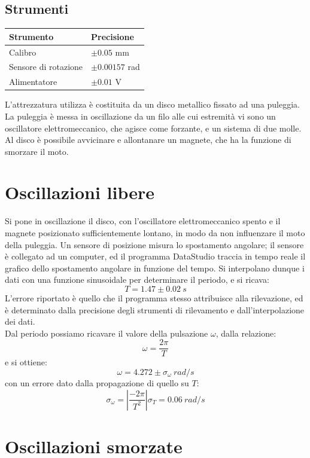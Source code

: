 \subsection{Strumenti}
\begin{center}
\begin{tabular}{l|l}
Strumento & Precisione\\
\midrule
Calibro & $\pm 0.05$ mm\\ 
Sensore di rotazione & $\pm 0.00157$ rad\\ 
Alimentatore & $\pm 0.01$ V\\ 

\end{tabular}
\end{center}
L'attrezzatura utilizza è costituita da un disco metallico fissato ad una puleggia. La puleggia è messa in oscillazione da un filo alle cui estremità vi sono un oscillatore  elettromeccanico, che agisce come forzante, e un sistema di due molle. Al disco è possibile avvicinare e allontanare un magnete, che ha la funzione di smorzare il moto.

\section{Oscillazioni libere}

Si pone in oscillazione il disco, con l'oscillatore elettromeccanico spento e il magnete posizionato sufficientemente lontano, in modo da non influenzare il moto della puleggia. Un sensore di posizione misura lo spostamento angolare; il sensore è collegato ad un computer, ed il programma DataStudio traccia in tempo reale il grafico dello spostamento angolare in funzione del tempo. Si interpolano dunque i dati con una funzione sinusoidale per determinare il periodo, e si ricava: $$T=1.47\pm0.02\ s$$ L'errore riportato è quello che il programma stesso attribuisce alla rilevazione, ed è determinato dalla precisione degli strumenti di rilevamento e dall'interpolazione dei dati.\\
Dal periodo possiamo ricavare il valore della pulsazione $\omega$, dalla relazione:
\begin{equation}\label{omepe}
\omega=\frac{2\pi}{T}
\end{equation}
e si ottiene:
$$\omega=4.272 \pm \sigma_\omega\ rad/s$$
con un errore dato dalla propagazione di quello su $T$:
$$\sigma_{\omega}= \left|\frac{-2\pi}{T^2}\right| \sigma_T=0.06\ rad/s$$
\section{Oscillazioni smorzate}

